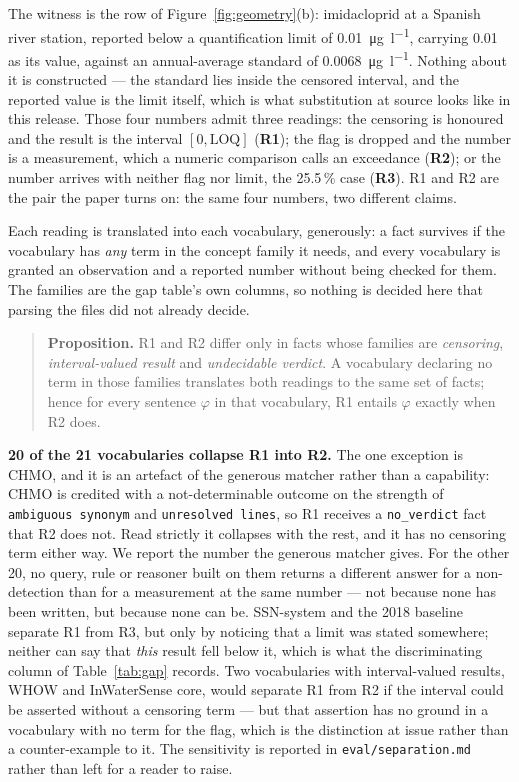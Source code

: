 The witness is the row of Figure~\ref{fig:geometry}(b): imidacloprid at a
Spanish river station, reported below a quantification limit of
\num{0.01}~\si{\micro\gram\per\litre}, carrying \num{0.01} as its value,
against an annual-average standard of
\num{0.0068}~\si{\micro\gram\per\litre}. Nothing about it is constructed --- the
standard lies inside the censored interval, and the reported value is the limit
itself, which is what substitution at source looks like in this release. Those
four numbers admit three readings: the censoring is honoured and the result is
the interval $[0,\mathrm{LOQ}]$ (\textbf{R1}); the flag is dropped and the
number is a measurement, which a numeric comparison calls an exceedance
(\textbf{R2}); or the number arrives with neither flag nor limit, the
\num{25.5}\,\% case (\textbf{R3}). R1 and R2 are the pair the paper turns on:
the same four numbers, two different claims.

Each reading is translated into each vocabulary, generously: a fact survives if
the vocabulary has \emph{any} term in the concept family it needs, and every
vocabulary is granted an observation and a reported number without being
checked for them. The families are the gap table's own columns, so nothing is
decided here that parsing the files did not already decide.

\begin{quote}
\textbf{Proposition.} R1 and R2 differ only in facts whose families are
\emph{censoring}, \emph{interval-valued result} and \emph{undecidable verdict}.
A vocabulary declaring no term in those families translates both readings to
the same set of facts; hence for every sentence $\varphi$ in that vocabulary,
R1 entails $\varphi$ exactly when R2 does.
\end{quote}

\textbf{\num{20} of the \num{21} vocabularies collapse R1 into R2.} The one
exception is CHMO, and it is an artefact of the generous matcher rather than a
capability: CHMO is credited with a not-determinable outcome on the strength of
\texttt{ambiguous synonym} and \texttt{unresolved lines}, so R1 receives a
\texttt{no\_verdict} fact that R2 does not. Read strictly it collapses with the
rest, and it has no censoring term either way. We report the number the generous
matcher gives. For the other \num{20}, no query, rule or
reasoner built on them returns a different answer for a non-detection than for
a measurement at the same number --- not because none has been written, but
because none can be. SSN-system and the \num{2018} baseline separate R1 from
R3, but only by noticing that a limit was stated somewhere; neither can say
that \emph{this} result fell below it, which is what the discriminating column
of Table~\ref{tab:gap} records. Two vocabularies with interval-valued results,
WHOW and InWaterSense core, would separate R1 from R2 if the interval could be
asserted without a censoring term --- but that assertion has no ground in a
vocabulary with no term for the flag, which is the distinction at issue rather
than a counter-example to it. The sensitivity is reported in
\texttt{eval/separation.md} rather than left for a reader to raise.

